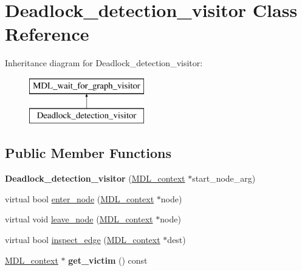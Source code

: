 \hypertarget{classDeadlock__detection__visitor}{}\section{Deadlock\+\_\+detection\+\_\+visitor Class Reference}
\label{classDeadlock__detection__visitor}
Inheritance diagram for Deadlock\+\_\+detection\+\_\+visitor\+:\begin{figure}[H]
\begin{center}
\leavevmode
\includegraphics[height=2.000000cm]{classDeadlock__detection__visitor}
\end{center}
\end{figure}
\subsection*{Public Member Functions}
\begin{DoxyCompactItemize}
\item 
\mbox{\label{classDeadlock__detection__visitor_a3a360b0a6c464f92b31e35e200e5d54e}} 
{\bfseries Deadlock\+\_\+detection\+\_\+visitor} (\mbox{\hyperlink{classMDL__context}{M\+D\+L\+\_\+context}} $\ast$start\+\_\+node\+\_\+arg)
\item 
virtual bool \mbox{\hyperlink{classDeadlock__detection__visitor_a770352475b3110f6fed5d7cd621ca113}{enter\+\_\+node}} (\mbox{\hyperlink{classMDL__context}{M\+D\+L\+\_\+context}} $\ast$node)
\item 
virtual void \mbox{\hyperlink{classDeadlock__detection__visitor_aa56aca6948788aeb22c760d783884d7b}{leave\+\_\+node}} (\mbox{\hyperlink{classMDL__context}{M\+D\+L\+\_\+context}} $\ast$node)
\item 
virtual bool \mbox{\hyperlink{classDeadlock__detection__visitor_a5026f36978b470869539c8171ad26875}{inspect\+\_\+edge}} (\mbox{\hyperlink{classMDL__context}{M\+D\+L\+\_\+context}} $\ast$dest)
\item 
\mbox{\label{classDeadlock__detection__visitor_a5fe0b32f5357074148ee2f7fed4a8066}} 
\mbox{\hyperlink{classMDL__context}{M\+D\+L\+\_\+context}} $\ast$ {\bfseries get\+\_\+victim} () const
\end{DoxyCompactItemize}
